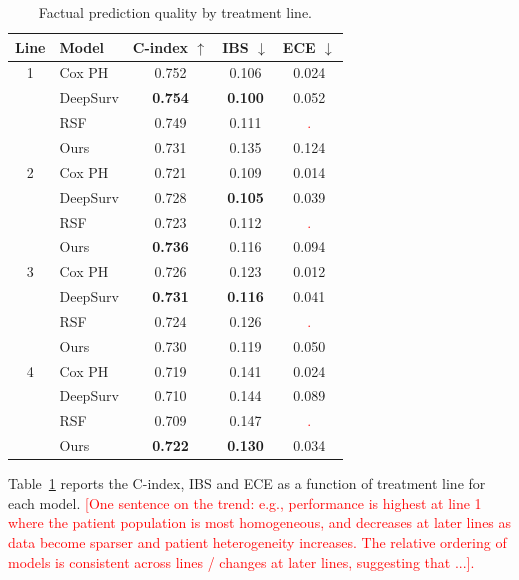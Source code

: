 \documentclass[a4paper,10pt]{article}
\begin{document}
\begin{table}[h]
\centering
\begin{tabular}{clccc}
\hline
\textbf{Line} & \textbf{Model} & \textbf{C-index $\uparrow$} & \textbf{IBS $\downarrow$} & \textbf{ECE $\downarrow$} \\
\hline
\multirow{3.5}{*}{1}
 & Cox PH                  & 0.752 & 0.106 & 0.024 \\
 & DeepSurv                & \textbf{0.754} & \textbf{0.100} & 0.052 \\
 & RSF                     & 0.749 & 0.111 & \textcolor{red}{.} \\
 & Ours    & 0.731 & 0.135 & 0.124 \\
\hline
\multirow{3.5}{*}{2}
 & Cox PH                  & 0.721 & 0.109 & 0.014 \\
 & DeepSurv                & 0.728 & \textbf{0.105} & 0.039 \\
 & RSF                     & 0.723 & 0.112 & \textcolor{red}{.} \\
 & Ours    & \textbf{0.736} & 0.116 & 0.094 \\
\hline
\multirow{3.5}{*}{3}
 & Cox PH                  & 0.726 & 0.123 & 0.012 \\
 & DeepSurv                & \textbf{0.731} & \textbf{0.116} & 0.041 \\
 & RSF                     & 0.724 & 0.126 & \textcolor{red}{.} \\
 & Ours    & 0.730 & 0.119 & 0.050 \\
\hline
\multirow{3.5}{*}{4}
 & Cox PH                  & 0.719 & 0.141 & 0.024 \\
 & DeepSurv                & 0.710 & 0.144 & 0.089 \\
 & RSF                     & 0.709 & 0.147 & \textcolor{red}{.} \\
 & Ours    & \textbf{0.722} & \textbf{0.130} & 0.034 \\
\hline
\end{tabular}
\caption{Factual prediction quality by treatment line.}
\label{tab:factual-perline}
\end{table}


Table~\ref{tab:factual-perline} reports the C-index, IBS and ECE as a function of treatment line for each model. \textcolor{red}{[One sentence on the trend: e.g., performance is highest at line 1 where the patient population is most homogeneous, and decreases at later lines as data become sparser and patient heterogeneity increases. The relative ordering of models is consistent across lines / changes at later lines, suggesting that ...].}
\end{document}
